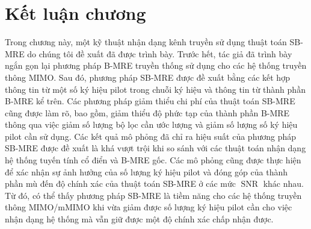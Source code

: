 \section{Kết luận chương}

Trong chương này, một kỹ thuật nhận dạng kênh truyền sử dụng thuật toán SB-MRE do chúng tôi đề xuất đã được trình bày. Trước hết, tác giả đã trình bày ngắn gọn lại phương pháp B-MRE truyền thống sử dụng cho các hệ thống truyền thông MIMO. Sau đó, phương pháp SB-MRE được đề xuất bằng các kết hợp thông tin từ một số ký hiệu pilot trong chuỗi ký hiệu và thông tin từ thành phần B-MRE kể trên. Các phương pháp giảm thiểu chi phí của thuật toán SB-MRE cũng được làm rõ, bao gồm, giảm thiểu độ phức tạp của thành phần B-MRE thông qua việc giảm số lượng bộ lọc cần ước lượng và giảm số lượng số ký hiệu pilot cần sử dụng. Các kết quả mô phỏng đã chỉ ra hiệu suất của phương pháp SB-MRE được đề xuất là khá vượt trội khi so sánh với các thuật toán nhận dạng hệ thống tuyến tính cổ điển và B-MRE gốc. Các mô phỏng cũng được thực hiện để xác nhận sự ảnh hưởng của số lượng ký hiệu pilot và đóng góp của thành phần mù đến độ chính xác của thuật toán SB-MRE ở các mức $\operatorname{SNR}$ khác nhau. Từ đó, có thể thấy phương pháp SB-MRE là tiềm năng cho các hệ thống truyền thông MIMO/mMIMO khi vừa giảm được số lượng ký hiệu pilot cần cho việc nhận dạng hệ thống mà vẫn giữ được một độ chính xác chấp nhận được.